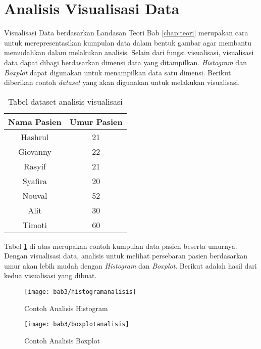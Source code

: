 \section{Analisis Visualisasi Data}
Visualisasi Data berdasarkan Landasan Teori Bab \ref{chap:teori} merupakan cara untuk merepresentasikan kumpulan data dalam bentuk gambar agar membantu memudahkan dalam melakukan analisis. Selain dari fungsi visualisasi, visualisasi data dapat dibagi berdasarkan dimensi data yang ditampilkan. \textit{Histogram} dan \textit{Boxplot} dapat digunakan untuk menampilkan data satu dimensi. Berikut diberikan contoh \textit{dataset} yang akan digunakan untuk melakukan visualisasi.


\begin{table}[H]
\caption{Tabel dataset analisis visualisasi}
\centering
\begin{tabular}{|c|c|}
  \hline 
  Nama Pasien & Umur Pasien \\ 
  \hline 
  Hashrul & 21 \\ 
  \hline 
  Giovanny & 22 \\ 
  \hline 
  Rasyif & 21 \\ 
  \hline 
  Syafira & 20 \\ 
  \hline 
  Nouval & 52 \\ 
  \hline 
  Alit & 30 \\ 
  \hline 
  Timoti & 60 \\ 
  \hline 
  \end{tabular}   
\label{tab:analisisvisualisasi}
\end{table}

Tabel \ref{tab:analisisvisualisasi} di atas merupakan contoh kumpulan data pasien beserta umurnya. Dengan visualisasi data, analisis untuk melihat persebaran pasien berdasarkan umur akan lebih mudah dengan \textit{Histogram} dan \textit{Boxplot}. Berikut adalah hasil dari kedua visualisasi yang dibuat.



\begin{figure}[H]
	\centering  
	\texttt{[image: bab3/histogramanalisis]}    
	\caption{Contoh Analisis Histogram }
	\label{fig:histogramanalisis}
\end{figure} 


\begin{figure}[H]
	\centering  
	\texttt{[image: bab3/boxplotanalisis]}   
	\caption{Contoh Analisis Boxplot }
	\label{fig:boxplotanalisis} 
\end{figure} 


